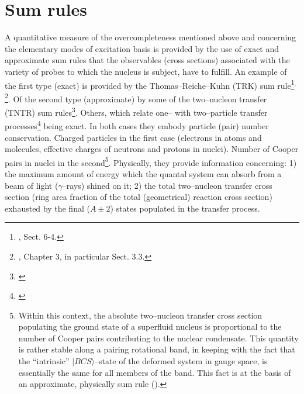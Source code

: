 




\section{Sum rules}\label{C1S2}
A quantitative measure of the overcompleteness mentioned above and concerning the elementary modes of excitation basis is provided by the use of exact and approximate sum rules that the observables (cross sections) associated with the variety of probes to which the nucleus is subject, have to fulfill. An example of the first type (exact) is provided by the Thomas--Reiche--Kuhn (TRK) sum rule\footnote{\cite{Bohr:75}, Sect. 6-4.}$^,$\footnote{\cite{Bertsch:05}, Chapter 3, in particular Sect. 3.3.}. Of the second type (approximate) by some of the two--nucleon transfer (TNTR) sum rules\footnote{\cite{Broglia:72b}}. Others, which relate one-- with two--particle transfer processes\footnote{\cite{Bayman:72,Lanford:77}} being exact. In both cases they embody particle (pair) number conservation. Charged particles in the first case (electrons in atoms and molecules, effective charges of neutrons and protons in nuclei). Number of Cooper pairs in nuclei in the second\footnote{Within this context, the absolute two--nucleon transfer cross section populating the ground state of a superfluid nucleus is proportional to the number of Cooper pairs contributing to the nuclear condensate. This quantity is rather stable along a pairing rotational band, in keeping with the fact that the ``intrinsic'' $|BCS\rangle$--state of the deformed system in gauge space, is essentially the same for all members of the band. This fact is at the basis of an approximate, physically sum rule \mbox{(\cite{Potel:17})}.}. Physically, they provide  information concerning: 1) the maximum amount of energy which the quantal system can absorb from a beam of light ($\gamma$--rays) shined on it; 2) the total two--nucleon transfer cross section (ring area fraction of the total (geometrical) reaction cross section) exhausted by the final ($A\pm2$) states populated in the transfer process.



